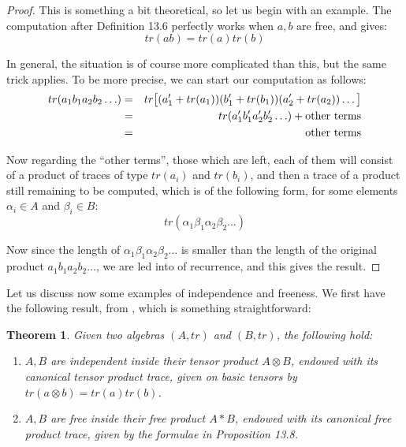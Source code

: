 \documentclass[12pt]{amsbook}
\newtheorem{theorem}{Theorem}[chapter]
\begin{document}
\begin{proof}
This is something a bit theoretical, so let us begin with an example. The computation after Definition 13.6 perfectly works when $a,b$ are free, and gives:
$$tr(ab)=tr(a)tr(b)$$

In general, the situation is of course more complicated than this, but the same trick applies. To be more precise, we can start our computation as follows:
\begin{eqnarray*}
tr(a_1b_1a_2b_2\ldots)
&=&tr\big[(a_1'+tr(a_1))(b_1'+tr(b_1))(a_2'+tr(a_2))\ldots\big]\\
&=&tr(a_1'b_1'a_2'b_2'\ldots)+{\rm other\ terms}\\
&=&{\rm other\ terms}
\end{eqnarray*}

Now regarding the ``other terms'', those which are left, each of them will consist of a product of traces of type $tr(a_i)$ and $tr(b_i)$, and then a trace of a product still remaining to be computed, which is of the following form, for some elements $\alpha_i\in A$ and $\beta_i\in B$:
$$tr(\alpha_1\beta_1\alpha_2\beta_2\ldots)$$

Now since the length of $\alpha_1\beta_1\alpha_2\beta_2\ldots$ is smaller than the length of the original product $a_1b_1a_2b_2\ldots$, we are led into of recurrence, and this gives the result.
\end{proof}

Let us discuss now some examples of independence and freeness. We first have the following result, from \cite{vo1}, which is something straightforward:

\begin{theorem}
Given two algebras $(A,tr)$ and $(B,tr)$, the following hold:
\begin{enumerate}
\item $A,B$ are independent inside their tensor product $A\otimes B$, endowed with its canonical tensor product trace, given on basic tensors by $tr(a\otimes b)=tr(a)tr(b)$.

\item $A,B$ are free inside their free product $A*B$, endowed with its canonical free product trace, given by the formulae in Proposition 13.8.
\end{enumerate}
\end{theorem}
\end{document}

